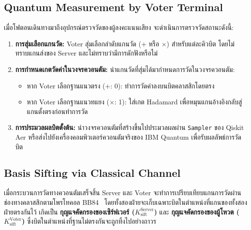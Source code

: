 \subsection{Quantum Measurement by Voter Terminal}
เมื่อโฟตอนเดินทางมาถึงอุปกรณ์ตรวจวัดของผู้ลงคะแนนเสียง จะดำเนินการตรวจวัดสถานะดังนี้:
\begin{enumerate}
    \item \textbf{การสุ่มเลือกแกนวัด:} Voter สุ่มเลือกลำดับแกนวัด ($+$ หรือ $\times$) สำหรับแต่ละคิวบิต โดยไม่ทราบแกนส่งของ Server และไม่ทราบว่ามีการดักฟังหรือไม่
    \item \textbf{การกำหนดเกตวัดค่าในวงจรควอนตัม:} นำแกนวัดที่สุ่มได้มากำหนดการวัดในวงจรควอนตัม:
    \begin{itemize}
        \item หาก Voter เลือกฐานแนวตรง ($+$: 0): ทำการวัดค่าลงบนบิตคลาสสิกโดยตรง
        \item หาก Voter เลือกฐานแนวทแยง ($\times$: 1): ใส่เกต Hadamard เพื่อหมุนแกนอ้างอิงกลับสู่แกนตั้งตรงก่อนทำการวัด
    \end{itemize}
    \item \textbf{การประมวลผลบิตตั้งต้น:} นำวงจรควอนตัมที่สร้างขึ้นไปประมวลผลผ่าน \texttt{Sampler} ของ Qiskit Aer หรือส่งไปยังเครื่องคอมพิวเตอร์ควอนตัมจริงของ IBM Quantum เพื่อรับผลลัพธ์การวัดบิต
\end{enumerate}

\subsection{Basis Sifting via Classical Channel}
เมื่อกระบวนการวัดทางควอนตัมเสร็จสิ้น Server และ Voter จะทำการเปรียบเทียบแกนการวัดผ่านช่องทางคลาสสิกตามโพรโทคอล BB84~\cite{bb84}
โดยทั้งสองฝ่ายจะเก็บเฉพาะบิตในตำแหน่งที่แกนของทั้งสองฝ่ายตรงกันไว้ เกิดเป็น \textbf{กุญแจคัดกรองของเซิร์ฟเวอร์ ($K_{\text{sift}}^{\text{Server}}$)} และ \textbf{กุญแจคัดกรองของผู้โหวต ($K_{\text{sift}}^{\text{Voter}}$)} ซึ่งบิตในตำแหน่งที่ฐานไม่ตรงกันจะถูกทิ้งไปอย่างถาวร

